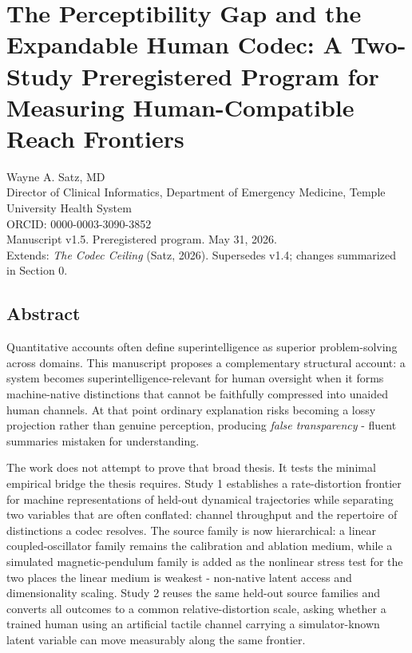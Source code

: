 \documentclass[
  11pt,
]{article}
\author{}
\date{}
\begin{document}
\section{The Perceptibility Gap and the
Expandable Human Codec: A Two-Study
Preregistered Program for Measuring
Human-Compatible Reach
Frontiers}\label{the-perceptibility-gap-and-the-expandable-human-codec-a-two-study-preregistered-program-for-measuring-human-compatible-reach-frontiers}

Wayne A. Satz, MD\\
Director of Clinical Informatics, Department of
Emergency Medicine, Temple University Health
System\\
ORCID: 0000-0003-3090-3852\\
Manuscript v1.5. Preregistered program. May 31,
2026.\\
Extends: \emph{The Codec Ceiling} (Satz, 2026).
Supersedes v1.4; changes summarized in Section
0.

\subsection{Abstract}\label{abstract}

Quantitative accounts often define
superintelligence as superior problem-solving
across domains. This manuscript proposes a
complementary structural account: a system
becomes superintelligence-relevant for human
oversight when it forms machine-native
distinctions that cannot be faithfully
compressed into unaided human channels. At that
point ordinary explanation risks becoming a
lossy projection rather than genuine perception,
producing \emph{false transparency} - fluent
summaries mistaken for understanding.

The work does not attempt to prove that broad
thesis. It tests the minimal empirical bridge
the thesis requires. Study 1 establishes a
rate-distortion frontier for machine
representations of held-out dynamical
trajectories while separating two variables that
are often conflated: channel throughput and the
repertoire of distinctions a codec resolves. The
source family is now hierarchical: a linear
coupled-oscillator family remains the
calibration and ablation medium, while a
simulated magnetic-pendulum family is added as
the nonlinear stress test for the two places the
linear medium is weakest - non-native latent
access and dimensionality scaling. Study 2
reuses the same held-out source families and
converts all outcomes to a common
relative-distortion scale, asking whether a
trained human using an artificial tactile
channel carrying a simulator-known latent
variable can move measurably along the same
frontier.
\end{document}
